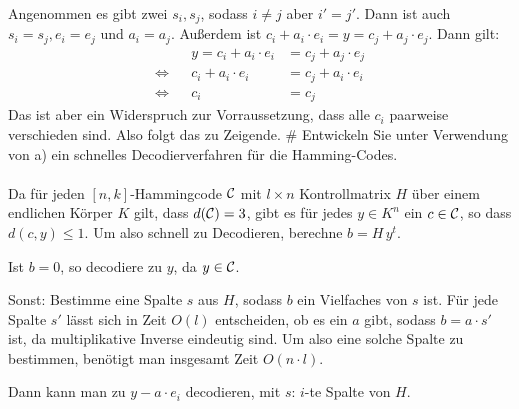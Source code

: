 \begin{myList}
Angenommen es gibt zwei $s_i, s_j$, sodass $i\not=j$ aber $i'=j'$. Dann ist auch $s_i=s_j, e_i=e_j$ und $a_i=a_j$. Außerdem ist $c_i + a_i\cdot e_i = y = c_j + a_j\cdot e_j$. Dann gilt:
\begin{align*}
&& y = c_i + a_i\cdot e_i &= c_j + a_j\cdot e_j\\
\iff && c_i + a_i\cdot e_i &= c_j + a_i\cdot e_i\\
\iff && c_i &= c_j
\end{align*}
Das ist aber ein Widerspruch zur Vorraussetzung, dass alle $c_i$ paarweise verschieden sind. Also folgt das zu Zeigende.
#
Entwickeln Sie unter Verwendung von a) ein schnelles Decodierverfahren für die Hamming-Codes.\\\\
Da für jeden $[n, k]$-Hammingcode $\mathcal{C}$ mit $l\times n$ Kontrollmatrix $H$ über einem endlichen Körper $K$ gilt, dass $d(\mathcal{C})=3$, gibt es für jedes $y\in K^n$ ein $c\in\mathcal{C}$, so dass $d(c, y)\leq 1$. Um also schnell zu Decodieren, berechne $b = H\,y^t$. 

Ist $b=0$, so decodiere zu $y$, da $y\in\mathcal{C}$. 

Sonst: Bestimme eine Spalte $s$ aus $H$, sodass $b$ ein Vielfaches von $s$ ist. Für jede Spalte $s'$ lässt sich in Zeit $O(l)$ entscheiden, ob es ein $a$ gibt, sodass $b=a\cdot s'$ ist, da multiplikative Inverse eindeutig sind. Um also eine solche Spalte zu bestimmen, benötigt man insgesamt Zeit $O(n\cdot l)$.

Dann kann man zu $y - a\cdot e_i$ decodieren, mit $s$: $i$-te Spalte von $H$.
\end{myList}
